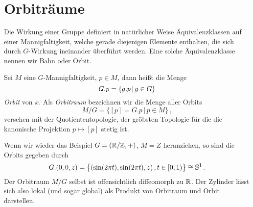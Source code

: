 \section{Orbiträume}
Die Wirkung einer Gruppe definiert in natürlicher
Weise Äquivalenzklassen auf einer Mannigfaltigkeit, welche gerade diejenigen
Elemente enthalten, die sich durch $G$-Wirkung ineinander überführt werden.
Eine solche Äquivalenzklasse nennen wir Bahn oder Orbit.
\begin{definition}[Orbit]
Sei $M$ eine $G$-Mannigfaltigkeit, $p\in M$, dann heißt die Menge
\begin{equation}
G . p=\{g . p\,|\,g\in G\}
\end{equation}
\emph{Orbit} von $x$. Als \emph{Orbitraum} bezeichnen wir die Menge aller Orbits
\begin{equation}
M/G=\{[p]=G.p\,|\,p\in M\}\,,
\end{equation}
versehen mit der Quotiententopologie, der gröbsten Topologie für die die
kanonische Projektion $p\mapsto [p]$ stetig ist.
\end{definition}
\begin{beispiel}
Wenn wir wieder das Beispiel $G=(\mathbb{R}/\mathbb{Z},+)$, $M=Z$ heranziehen, so
sind die Orbits gegeben durch
\begin{equation}
G.(0,0,z)=\left\{(\sin (2\pi t),\sin (2\pi t),z)\,,t \in
[0,1)\right\}\cong\Sphere^1\,.
\end{equation}
Der Orbitraum $M/G$ selbst ist offensichtlich diffeomorph zu $\mathbb{R}$. Der
Zylinder lässt sich also lokal (und sogar global) als Produkt von Orbitraum und
Orbit darstellen.
\end{beispiel}
